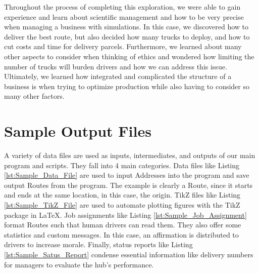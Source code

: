 \documentclass[letterpaper]{article}
\begin{document}
    Throughout the process of completing this exploration, we were able to gain experience and learn about scientific management and how to be very precise when managing a business with simulations. In this case, we discovered how to deliver the best route, but also decided how many trucks to deploy, and how to cut costs and time for delivery parcels. Furthermore, we learned about many other aspects to consider when thinking of ethics and wondered how limiting the number of trucks will burden drivers and how we can address this issue. Ultimately, we learned how integrated and complicated the structure of a business is when trying to optimize production while also having to consider so many other factors. 

    \appendix
    \section{Sample Output Files}
    \label{appendix:Sample_Output_Files}

    A variety of data files are used as inputs, intermediates, and outputs of our main program and scripts. They fall into 4 main categories. Data files like Listing \ref{lst:Sample_Data_File} are used to input Addresses into the program and save output Routes from the program. The example is clearly a Route, since it starts and ends at the same location, in this case, the origin. TikZ files like Listing \ref{lst:Sample_TikZ_File} are used to automate plotting figures with the TikZ package in \LaTeX . Job assignments like Listing \ref{lst:Sample_Job_Assignment} format Routes such that human drivers can read them. They also offer some statistics and custom messages. In this case, an affirmation is distributed to drivers to increase morale. Finally, status reports like Listing \ref{lst:Sample_Satus_Report} condense essential information like delivery numbers for managers to evaluate the hub's performance.

    

    

    

    

    
    
\end{document}

